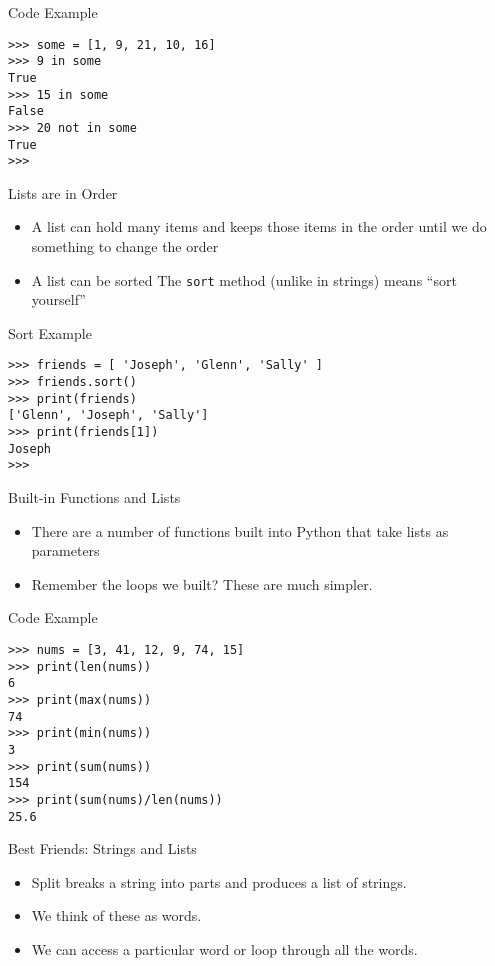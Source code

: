 \documentclass[serif, aspectratio=169]{beamer}
\begin{document}
\begin{frame}[fragile]{Code Example}
    \begin{lstlisting}
>>> some = [1, 9, 21, 10, 16]
>>> 9 in some
True
>>> 15 in some
False
>>> 20 not in some
True
>>> 
    \end{lstlisting}
\end{frame}

\begin{frame}{Lists are in Order}
    \begin{itemize}
        \item A list can hold many items and keeps those items in the order until we do something to change the order
        \item A list can be sorted 
        \irem The \texttt{\color{red}sort} method (unlike in strings) means “sort yourself”
    \end{itemize}
\end{frame}

\begin{frame}[fragile]{Sort Example}
    \begin{lstlisting}
>>> friends = [ 'Joseph', 'Glenn', 'Sally' ]
>>> friends.sort()
>>> print(friends)
['Glenn', 'Joseph', 'Sally']
>>> print(friends[1])
Joseph
>>> 
    \end{lstlisting}
\end{frame}

\begin{frame}{Built-in Functions and Lists}
    \begin{itemize}
        \item There are a number of functions built into Python that take lists as parameters
        \item Remember the loops we built?  These are much simpler.
    \end{itemize}
\end{frame}

\begin{frame}[fragile]{Code Example}
    \begin{lstlisting}
>>> nums = [3, 41, 12, 9, 74, 15]
>>> print(len(nums))
6
>>> print(max(nums))
74
>>> print(min(nums))
3
>>> print(sum(nums))
154
>>> print(sum(nums)/len(nums))
25.6
    \end{lstlisting}
\end{frame}

\begin{frame}{Best Friends: Strings and Lists}
    \begin{itemize}
        \item Split breaks a string into parts and produces a list of strings.  
        \item We think of these as words.  
        \item We can access a particular word or loop through all the words.
    \end{itemize}
\end{frame}
\end{document}
